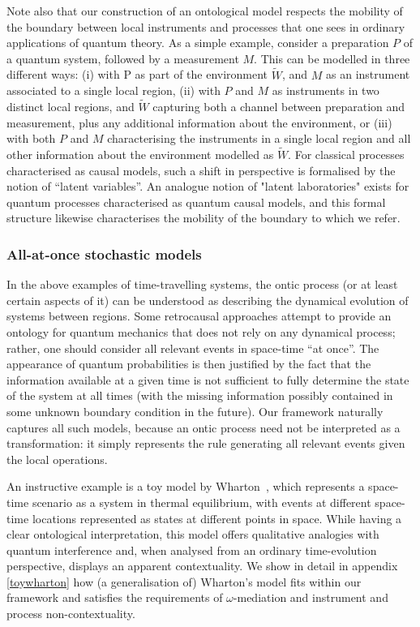 \documentclass[a4paper,onecolumn,11pt,accepted=2018-05-04]{quantumarticle}
\begin{document}
Note also that our construction of an ontological model respects the mobility of the boundary between local instruments and processes that one sees in ordinary applications of quantum theory. As a simple example, consider a preparation $P$ of a quantum system, followed by a measurement $M$. This can be modelled in three different ways: (i) with P as part of the environment $\tilde{W}$, and $M$ as an instrument associated to a single local region, (ii) with $P$ and $M$ as instruments in two distinct local regions, and $\tilde{W}$  capturing both a channel between preparation and measurement, plus any additional information about the environment, or  (iii) with both $P$ and $M$ characterising the instruments in a single local region and all other information about the environment modelled as $\tilde{W}$. For classical processes characterised as causal models, such a shift in perspective is formalised by the notion of ``latent variables''\cite{Pearlbook}. An analogue notion of "latent laboratories" exists for quantum processes characterised as quantum causal models, and this formal structure likewise characterises the mobility of the boundary to which we refer\cite{costa2016}.



\subsubsection{All-at-once stochastic models}
In the above examples of time-travelling systems, the ontic process (or at least certain aspects of it) can be understood as describing the dynamical evolution of systems between regions. Some retrocausal approaches attempt to provide an ontology for quantum mechanics that does not rely on any dynamical process; rather, one should consider all relevant events in space-time ``at once''. The appearance of quantum probabilities is then justified by the fact that the information available at a given time is not sufficient to fully determine the state of the system at all times (with the missing information possibly contained in some unknown boundary condition in the future). Our framework naturally captures all such models, because an ontic process need not be interpreted as a transformation: it simply represents the rule generating all relevant events given the local operations. 

An instructive example is a toy model by Wharton~\cite{Wharton2014}, which represents a space-time scenario as a system in thermal equilibrium, with events at different space-time locations represented as states at different points in space. While having a clear ontological interpretation, this model offers qualitative analogies with quantum interference and, when analysed from an ordinary time-evolution perspective, displays an apparent contextuality. We show in detail in appendix \ref{toywharton} how (a generalisation of) Wharton's model fits within our framework and satisfies the requirements of $\omega$-mediation and instrument and process non-contextuality.
\end{document}
